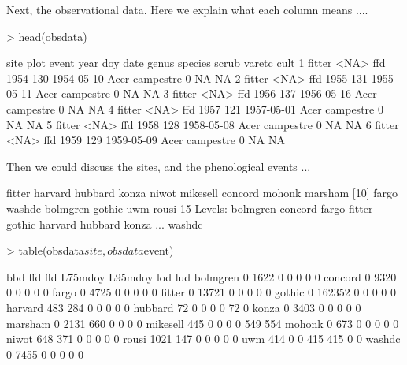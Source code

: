 \documentclass{article}
\begin{document}
Next, the observational data. Here we explain what each column means ....

\begin{Schunk}
\begin{Sinput}
> head(obsdata)
\end{Sinput}
\begin{Soutput}
    site plot event year doy       date genus   species scrub varetc cult
1 fitter <NA>   ffd 1954 130 1954-05-10  Acer campestre     0     NA   NA
2 fitter <NA>   ffd 1955 131 1955-05-11  Acer campestre     0     NA   NA
3 fitter <NA>   ffd 1956 137 1956-05-16  Acer campestre     0     NA   NA
4 fitter <NA>   ffd 1957 121 1957-05-01  Acer campestre     0     NA   NA
5 fitter <NA>   ffd 1958 128 1958-05-08  Acer campestre     0     NA   NA
6 fitter <NA>   ffd 1959 129 1959-05-09  Acer campestre     0     NA   NA
\end{Soutput}
\end{Schunk}

Then we could discuss the sites, and the phenological events ...

\begin{Schunk}
\begin{Soutput}
 [1] fitter   harvard  hubbard  konza    niwot    mikesell concord  mohonk   marsham 
[10] fargo    washdc   bolmgren gothic   uwm      rousi   
15 Levels: bolmgren concord fargo fitter gothic harvard hubbard konza ... washdc
\end{Soutput}
\end{Schunk}

\begin{Schunk}
\begin{Sinput}
> table(obsdata$site, obsdata$event)
\end{Sinput}
\begin{Soutput}
              bbd    ffd    fld L75mdoy L95mdoy    lod    lud
  bolmgren      0   1622      0       0       0      0      0
  concord       0   9320      0       0       0      0      0
  fargo         0   4725      0       0       0      0      0
  fitter        0  13721      0       0       0      0      0
  gothic        0 162352      0       0       0      0      0
  harvard     483    284      0       0       0      0      0
  hubbard      72      0      0       0       0     72      0
  konza         0   3403      0       0       0      0      0
  marsham       0   2131    660       0       0      0      0
  mikesell    445      0      0       0       0    549    554
  mohonk        0    673      0       0       0      0      0
  niwot       648    371      0       0       0      0      0
  rousi      1021    147      0       0       0      0      0
  uwm         414      0      0     415     415      0      0
  washdc        0   7455      0       0       0      0      0
\end{Soutput}
\end{Schunk}
\end{document}
